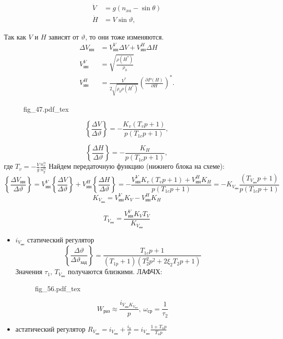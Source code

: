 \documentclass{article}
\newcommand{\incfig}[1]{
    {#1.pdf_tex}
}
\begin{document}
\begin{align*}
	\dot{V} & = g(n_{xa} - \sin{\theta}) \\
	\dot{H} & = V \sin{\vartheta} ,
\end{align*}

Так как $V$ и $H$ зависят от $\vartheta$, то они тоже изменяются.
\begin{align*}
	\Delta V_\text{ин} & = V_\text{ин}^V \Delta V + V_\text{ин}^H \Delta H
	\\
	V_\text{ин}^V      & = \sqrt{\frac{\rho(H^*)}{\rho_0}}
	\\
	V_\text{ин}^H      & = \frac{V^*}{2 \sqrt{\rho_0 \rho(H^*)}} \left(
	\frac{\partial P(H)}{\partial H} \right)^*.
\end{align*}

\begin{figure}[H]
	\centering
	\incfig{fig_47}
	\label{fig:fig_47}
\end{figure}

\[
	\left\{ \frac{\Delta V}{\Delta \vartheta} \right\} = - \frac{K_v(T_v p +
		1)}{p(T_{1c} p + 1)},
\]

\[
	\left\{ \frac{\Delta H}{\Delta \vartheta} \right\} = - \frac{K_H}{p(T_{1c}
		p + 1)},
\]
где $T_v = -\frac{V}{g} \frac{n_x^\alpha}{ n_y^\alpha}$
Найдем передаточную функцию (нижнего блока на схеме):
\[
	\left\{ \frac{\Delta V_\text{ин}}{\Delta \vartheta} \right\} =
	V_\text{ин}^V \left\{ \frac{\Delta V}{\Delta \vartheta} \right\} +
	V_\text{ин}^H \left\{ \frac{\Delta H }{\Delta \vartheta} \right\} = -
	\frac{ V_\text{ин}^V K_v (T_v p + 1) + V_\text{ин}^H K_H}{p(T_{1c} p + 1)}
	= -K_{ V_\text{ин}} \frac{(T_{ V_\text{ин}} p + 1)}{p (T_{1c} p +1)}
\]
\[
	K_{ V_\text{ин}} = V_\text{ин}^V K_V  - V_\text{ин}^H K_H
\]

\[
	T_{ V_\text{ин}}  =\frac{ V_\text{ин}^V K_V T_V}{ K_{ V_\text{ин}}}
\]
\begin{itemize}
	\item  $i_{ V_\text{ин}}$ статический регулятор
	      \[
		      \left\{ \frac{\Delta \vartheta}{\Delta \vartheta_\text{зад}}
		      \right\} = \frac{T_{1c}p + 1}{ (T_{1p} + 1)( T_2^2 p^2 + 2 \xi_2
			      T_2p + 1) }
	      \]
	      Значения $\tau_1$, $T_{ V_\text{ин}}$ получаются близкими.
	      ЛАФЧХ:
	      \begin{figure}[H]
		      \centering
		      \incfig{fig_56}
		      \label{fig:fig_56}
	      \end{figure}
	      \[
		      W_\text{раз} \approx \frac{i_{ V_\text{ин}K_{ V_\text{ин} }}}{p},
		      \ \omega_\text{ср} = \frac{1}{\tau_2}
	      \]
	\item астатический регулятор $R_{ V_\text{ин}} = i_{ V_\text{ин}} + \frac{
			      i_u}{p} = i_{ V_\text{ин} } \frac{1 + T_u p }{T_u p}$
\end{itemize}
\end{document}
